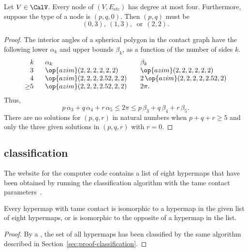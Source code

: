 \begin{lemma}[]\label{lemma:no-5} 
  Let $V\in \CalV$.  Every node of $(V,E_{ctc})$ has degree at most
  four.  Furthermore, suppose the type of a node is $(p,q,0)$.  Then
  $(p,q)$ must be
\[
(0,3),~(1,3),~\text{ or}~~(2,2).
\]
\end{lemma}

\begin{proof} The interior angles of a spherical polygon in the
  contact graph have the following lower $\alpha_k$ and upper bounds
  $\beta_k$, as a function of the number of sides $k$.
\begin{equation}
\begin{array}{lllll}
  \phantom{\ge}k~~&\alpha_k & \beta_k\\
  \phantom{\ge}3~~&\op{azim}(2,2,2,2,2,2)  &\op{azim}(2,2,2,2,2,2)\\
  \phantom{\ge}4~~&\op{azim}(2,2,2,2.52,2,2) &2\,\op{azim}(2,2,2,2,2.52,2)\\
  {\ge}5~~& \op{azim}(2,2,2,2.52,2,2) ~~~& 2\pi.
\end{array}
\end{equation}
Thus,
\[
  p\,\alpha_3 + q\,\alpha_4 +r\, \alpha_5 
\le 2\pi \le p\,\beta_3 + q\,\beta_4 + r \,\beta_5.
\]
There are no solutions for
$(p,q,r)$ in natural numbers when $p+q+r\ge 5$ and
 only the three given solutions in $(p,q,r)$ with $r=0$.
\end{proof}



\subsection{classification}

The website for the computer code  contains a list of eight hypermaps
that have been obtained by running the classification algorithm with
the tame contact parameters~\cite{website:FlyspeckProject}.

\begin{lemma}\cutrate{}
  \label{lemma:contact-classification} Every hypermap with tame
  contact is isomorphic to a hypermap in the given list of eight
  hypermaps, or is isomorphic to the opposite of a hypermap in the
  list.  %
\end{lemma}

\begin{proof}
  By a , %
 the set of all hypermaps has been classified by the same
  algorithm described in Section~\ref{sec:proof-classification}.
\end{proof}



